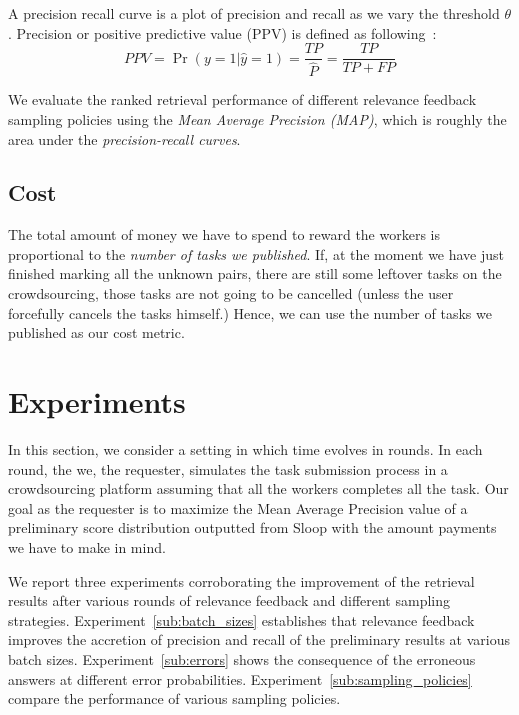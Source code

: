 A precision recall curve is a plot of precision and recall as we  vary the
threshold $\theta$. Precision or positive predictive value (PPV) is defined as
following~\cite{manning2008introduction}: $$PPV = \Pr{(y=1|\hat{y}=1)} =
\frac{TP}{\hat{P}} = \frac{TP}{TP+FP}$$

We evaluate the ranked retrieval performance of different relevance feedback
sampling policies using the \emph{Mean Average Precision (MAP)}, which is
roughly the area under the \emph{precision-recall curves}.

\subsection{Cost} %
\label{sub:cost}

The total amount of money we have to spend to reward the workers is
proportional to the \emph{number of tasks we published}. If, at the moment we
have just finished marking all the unknown pairs, there are still some leftover
tasks on the crowdsourcing, those tasks are not going to be cancelled (unless
the user forcefully cancels the tasks himself.) Hence, we can use the number of
tasks we published as our cost metric.


\section{Experiments} %
\label{sec:experiments}

In this section, we consider a setting in which time evolves in rounds. In each
round, the we, the requester, simulates the task submission process in a
crowdsourcing platform assuming that all the workers completes all the task.
Our goal as the requester is to maximize the Mean Average Precision value of a
preliminary score distribution outputted from Sloop with the amount payments we
have to make in mind.

We report three experiments corroborating the improvement of the retrieval
results after various rounds of relevance feedback and different sampling
strategies.  Experiment~\ref{sub:batch_sizes} establishes that relevance
feedback improves the accretion of precision and recall of the preliminary
results at various batch sizes.  Experiment~\ref{sub:errors} shows the
consequence of the erroneous answers at different error probabilities.
Experiment~\ref{sub:sampling_policies} compare the performance of various
sampling policies.

